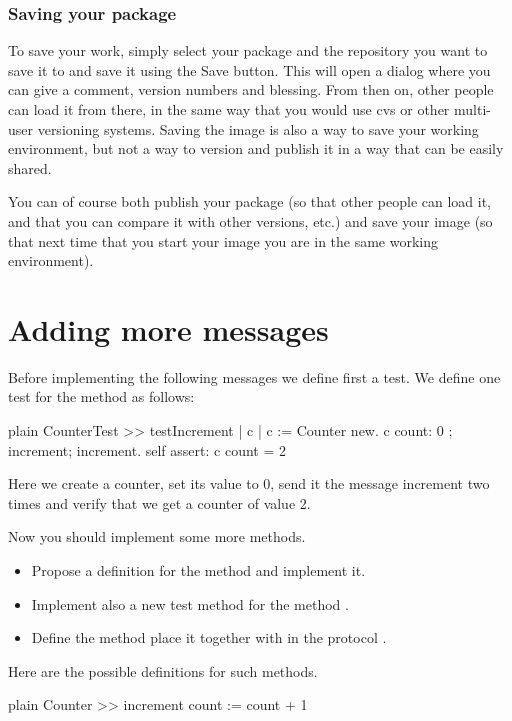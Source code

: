 \documentclass[10pt,twoside,english]{_support/latex/sbabook/sbabook}
\begin{document}
\subsubsection{Saving your package}
To save your work, simply select your package and the repository you want to save it to and save it using the Save button. This will open a dialog where you can give a comment, version numbers and blessing. From then on, other people can load it from there, in the same way that you would use cvs or other multi-user versioning systems. Saving the image is also a way to save your working environment, but not a way to version and publish it in a way that can be easily shared.

You can of course both publish your package (so that other people can load it, and that you can compare it with other versions, etc.) and save your image (so that next time that you start your image you are in the same working environment).
\section{Adding more messages}
Before implementing the following messages we define first a test.
We define one test for the method  as follows:

\begin{displaycode}{plain}
CounterTest >> testIncrement
   | c |
   c := Counter new.
   c count: 0 ; increment; increment.
   self assert: c count = 2
\end{displaycode}

Here we create a counter, set its value to 0, send it the message increment two times and verify that we get a counter of value 2. 

Now you should implement some more methods. 

\begin{itemize}
\item Propose a definition for the method  and implement it. 
\item Implement also a new test method for the method .
\item Define the method  place it together with  in the protocol .
\end{itemize}

Here are the possible definitions for such methods. 

\begin{displaycode}{plain}
Counter >> increment
   count := count + 1
\end{displaycode}
\end{document}
